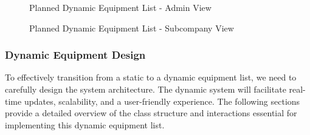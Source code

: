 \begin{figure}[H]
    \centering
    \caption{Planned Dynamic Equipment List - Admin View}
    \label{fig:dynamic_equipment_list_admin}
\end{figure}

\begin{figure}[H]
    \centering
    \caption{Planned Dynamic Equipment List - Subcompany View}
    \label{fig:dynamic_equipment_list_subcompany}
\end{figure}

\subsubsection{Dynamic Equipment Design}
To effectively transition from a static to a dynamic equipment list, we need to carefully design the system architecture. The dynamic system will facilitate real-time updates, scalability, and a user-friendly experience. The following sections provide a detailed overview of the class structure and interactions essential for implementing this dynamic equipment list.


